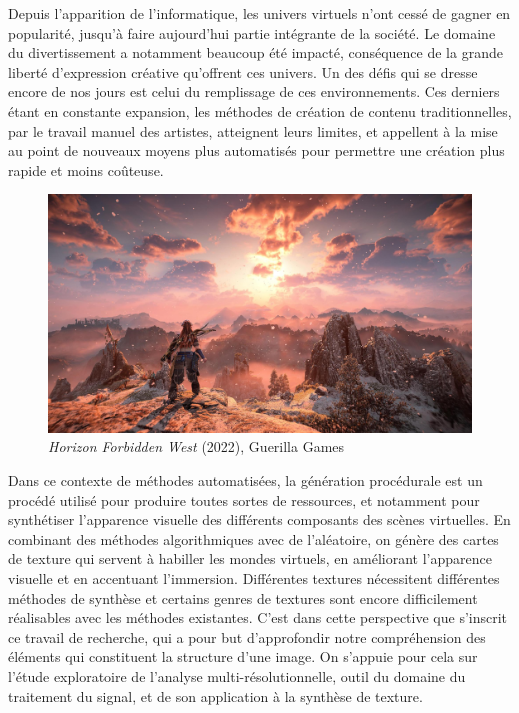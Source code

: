 \Introduction
\label{chap:introduction}

Depuis l'apparition de l'informatique, les univers virtuels n'ont cessé de gagner en popularité, jusqu'à faire aujourd'hui partie intégrante de la société. Le domaine du divertissement a notamment beaucoup été impacté, conséquence de la grande liberté d'expression créative qu'offrent ces univers. Un des défis qui se dresse encore de nos jours est celui du remplissage de ces environnements. Ces derniers étant en constante expansion, les méthodes de création de contenu traditionnelles, par le travail manuel des artistes, atteignent leurs limites, et appellent à la mise au point de nouveaux moyens plus automatisés pour permettre une création plus rapide et moins coûteuse.

\bigskip

\begin{figure}[!h]
    \centering
    \includegraphics[width=.75\textwidth]{contenu/resources/images/Horizon-Forbidden-West}
    \caption{{\it Horizon Forbidden West} (2022), Guerilla Games}
    \label{fig:horizon}
\end{figure}

Dans ce contexte de méthodes automatisées, la génération procédurale est un procédé utilisé pour produire toutes sortes de ressources, et notamment pour synthétiser l'apparence visuelle des différents composants des scènes virtuelles. En combinant des méthodes algorithmiques avec de l'aléatoire, on génère des cartes de texture qui servent à habiller les mondes virtuels, en améliorant l'apparence visuelle et en accentuant l'immersion. Différentes textures nécessitent différentes méthodes de synthèse et certains genres de textures sont encore difficilement réalisables avec les méthodes existantes. C'est dans cette perspective que s'inscrit ce travail de recherche, qui a pour but d'approfondir notre compréhension des éléments qui constituent la structure d'une image. On s'appuie pour cela sur l'étude exploratoire de l'analyse multi-résolutionnelle, outil du domaine du traitement du signal, et de son application à la synthèse de texture.

